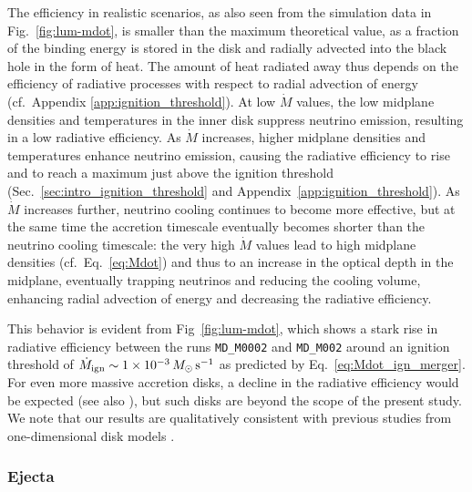 The efficiency in realistic scenarios, as also seen from the simulation data in Fig.~\ref{fig:lum-mdot}, is smaller than the maximum theoretical value, as a fraction of the binding energy is stored in the disk and radially advected into the black hole in the form of heat. The amount of heat radiated away thus depends on the efficiency of radiative processes with respect to radial advection of energy (cf.~Appendix \ref{app:ignition_threshold}). At low $\dot M$ values, the low midplane densities and temperatures in the inner disk suppress neutrino emission, resulting in a low radiative efficiency. As $\dot M$ increases, higher midplane densities and temperatures enhance neutrino emission, causing the radiative efficiency to rise and to reach a maximum just above the ignition threshold (Sec.~\ref{sec:intro_ignition_threshold} and Appendix~\ref{app:ignition_threshold}). As $\dot M$ increases further, neutrino cooling continues to become more effective, but at the same time the accretion timescale eventually becomes shorter than the neutrino cooling timescale: the very high $\dot M$ values lead to high midplane densities (cf.~Eq.~\eqref{eq:Mdot}) and thus to an increase in the optical depth in the midplane, eventually trapping neutrinos and reducing the cooling volume, enhancing radial advection of energy and decreasing the radiative efficiency. 

This behavior is evident from Fig~\ref{fig:lum-mdot}, which shows a stark rise in radiative efficiency between the runs \texttt{MD\_M0002} and \texttt{MD\_M002} around an ignition threshold of $\dot{M}_{\rm ign}\sim 1\times 10^{-3}\,M_\odot\,{\rm s}^{-1}$ as predicted by Eq.~\eqref{eq:Mdot_ign_merger}. For even  more massive accretion disks, a decline in the radiative efficiency would be expected (see also \cite{chen_neutrino-cooled_2007}), but such disks are beyond the scope of the present study. We note that our results are qualitatively consistent with previous studies from one-dimensional disk models \cite{chen_neutrino-cooled_2007}.





\subsubsection{Ejecta}
\label{sec:ejecta}

